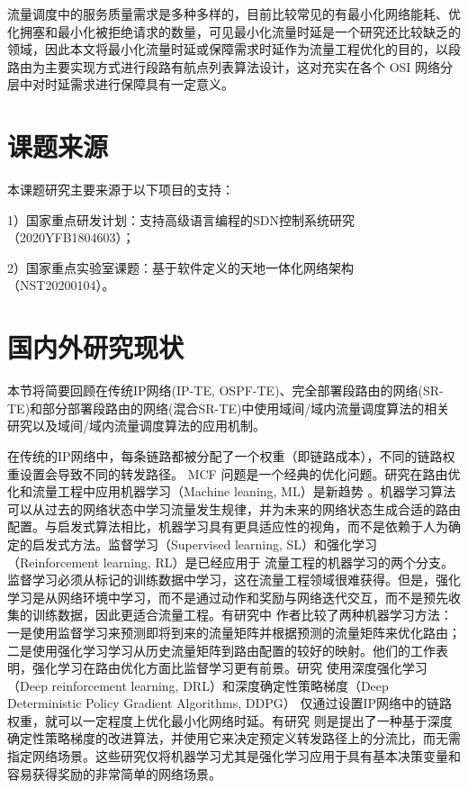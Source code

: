 流量调度中的服务质量需求是多种多样的，目前比较常见的有最小化网络能耗、优化拥塞和最小化被拒绝请求的数量，可见最小化流量时延是一个研究还比较缺乏的领域，因此本文将最小化流量时延或保障需求时延作为流量工程优化的目的，以段路由为主要实现方式进行段路有航点列表算法设计，这对充实在各个 \gls*{OSI} 网络分层中对时延需求进行保障具有一定意义。

\section{课题来源}
本课题研究主要来源于以下项目的支持：

1）国家重点研发计划：支持高级语言编程的SDN控制系统研究（2020YFB1804603）；

2）国家重点实验室课题：基于软件定义的天地一体化网络架构（NST20200104）。

\section{国内外研究现状}

本节将简要回顾在传统IP网络(IP-TE, OSPF-TE)、完全部署段路由的网络(SR-TE)和部分部署段路由的网络(混合SR-TE)中使用域间/域内流量调度算法的相关研究以及域间/域内流量调度算法的应用机制。

在传统的IP网络中，每条链路都被分配了一个权重（即链路成本），不同的链路权重设置会导致不同的转发路径。 \gls*{MCF} 问题是一个经典的优化问题。研究在路由优化和流量工程中应用机器学习（Machine leaning, ML）是新趋势 \cite{MLALNET} 。机器学习算法可以从过去的网络状态中学习流量发生规律，并为未来的网络状态生成合适的路由配置。与启发式算法相比，机器学习具有更具适应性的视角，而不是依赖于人为确定的启发式方法。监督学习（Supervised learning, SL）和强化学习（Reinforcement learning, RL）是已经应用于 流量工程的机器学习的两个分支。监督学习必须从标记的训练数据中学习，这在流量工程领域很难获得。但是，强化学习是从网络环境中学习，而不是通过动作和奖励与网络迭代交互，而不是预先收集的训练数据，因此更适合流量工程。有研究中 \cite{MLALNET} 作者比较了两种机器学习方法：一是使用监督学习来预测即将到来的流量矩阵并根据预测的流量矩阵来优化路由；二是使用强化学习学习从历史流量矩阵到路由配置的较好的映射。他们的工作表明，强化学习在路由优化方面比监督学习更有前景。研究 \cite{MLSR2} 使用深度强化学习（Deep reinforcement learning, DRL）和深度确定性策略梯度（Deep Deterministic Policy Gradient Algorithms, DDPG）\cite{MLSR3} 仅通过设置IP网络中的链路权重，就可以一定程度上优化最小化网络时延。有研究 \cite{MLSR1} 则是提出了一种基于深度确定性策略梯度的改进算法，并使用它来决定预定义转发路径上的分流比，而无需指定网络场景。这些研究仅将机器学习尤其是强化学习应用于具有基本决策变量和容易获得奖励的非常简单的网络场景。

